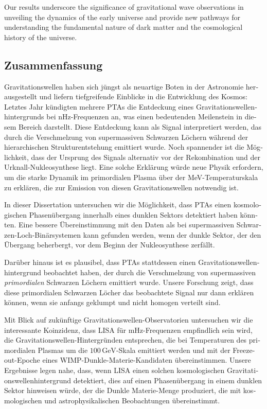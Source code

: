 Our results underscore the significance of gravitational wave observations in unveiling the dynamics of the early universe and provide new pathways for understanding the fundamental nature of dark matter and the cosmological history of the universe.


\newpage
\begin{otherlanguage}{ngerman}
\chapter*{Zusammenfassung}
Gravitationswellen haben sich jüngst als neuartige Boten in der Astronomie herausgestellt und liefern tiefgreifende Einblicke in die Entwicklung des Kosmos: Letztes Jahr kündigten mehrere \acp{PTA} die Entdeckung eines Gravitationswellenhintergrunds bei nHz-Frequenzen an, was einen bedeutenden Meilenstein in diesem Bereich darstellt. Diese Entdeckung kann als Signal interpretiert werden, das durch die Verschmelzung von supermassiven Schwarzen Löchern während der hierarchischen Strukturentstehung emittiert wurde. Noch spannender ist die Möglichkeit, dass der Ursprung des Signals alternativ vor der Rekombination und der Urknall-Nukleosynthese liegt. Eine solche Erklärung würde neue Physik erfordern, um die starke Dynamik im primordialen Plasma über der MeV-Temperaturskala zu erklären, die zur Emission von diesen Gravitationswellen notwendig ist.

In dieser Dissertation untersuchen wir die Möglichkeit, dass \acp{PTA} einen kosmologischen Phasenübergang innerhalb eines dunklen Sektors detektiert haben könnten. Eine bessere Übereinstimmung mit den Daten als bei supermassiven Schwarzen-Loch-Binärsystemen kann gefunden werden, wenn der dunkle Sektor, der den Übergang beherbergt, vor dem Beginn der Nukleosynthese zerfällt.

Darüber hinaus ist es plausibel, dass \acp{PTA} stattdessen einen Gravitationswellenhintergrund beobachtet haben, der durch die Verschmelzung von supermassiven \textit{primordialen} Schwarzen Löchern emittiert wurde. Unsere Forschung zeigt, dass diese primordialen Schwarzen Löcher das beobachtete Signal nur dann erklären können, wenn sie anfangs geklumpt und nicht homogen verteilt sind.

Mit Blick auf zukünftige Gravitationswellen-Observatorien untersuchen wir die interessante Koinzidenz, dass \acs{LISA} für mHz-Frequenzen empfindlich sein wird, die Gravitationswellen-Hintergründen entsprechen, die bei Temperaturen des primordialen Plasmas um die $100 \, \text{GeV}$-Skala emittiert werden und mit der Freeze-out-Epoche eines \acs{WIMP}-Dunkle-Materie-Kandidaten übereinstimmen. Unsere Ergebnisse legen nahe, dass, wenn \acs{LISA} einen solchen kosmologischen Gravitationswellenhintergrund detektiert, dies auf einen Phasenübergang in einem dunklen Sektor hinweisen würde, der die Dunkle Materie-Menge  produziert, die mit kosmologischen und astrophysikalischen Beobachtungen übereinstimmt.


\end{otherlanguage}
